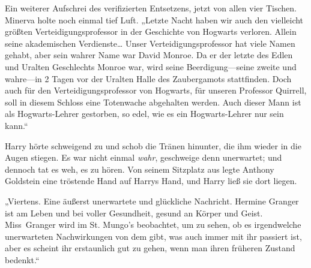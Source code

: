 Ein weiterer Aufschrei des verifizierten Entsetzens, jetzt von allen vier Tischen.
Minerva holte noch einmal tief Luft.
„Letzte Nacht haben wir auch den vielleicht größten Verteidigungsprofessor in der Geschichte von Hogwarts verloren. Allein seine akademischen Verdienste… Unser Verteidigungsprofessor hat viele Namen gehabt, aber sein wahrer Name war David Monroe. Da er der letzte des Edlen und Uralten Geschlechts Monroe war, wird seine Beerdigung—seine zweite und wahre—in 2 Tagen vor der Uralten Halle des Zaubergamots stattfinden. Doch auch für den Verteidigungsprofessor von Hogwarts, für unseren Professor Quirrell, soll in diesem Schloss eine Totenwache abgehalten werden. Auch dieser Mann ist als Hogwarts-Lehrer gestorben, so edel, wie es ein Hogwarts-Lehrer nur sein kann.“

Harry hörte schweigend zu und schob die Tränen hinunter, die ihm wieder in die Augen stiegen. Es war nicht einmal \emph{wahr}, geschweige denn unerwartet; und dennoch tat es weh, es zu hören.
Von seinem Sitzplatz aus legte Anthony Goldstein eine tröstende Hand auf Harrys Hand, und Harry ließ sie dort liegen.

„Viertens. Eine äußerst unerwartete und glückliche Nachricht. Hermine Granger ist am Leben und bei voller Gesundheit, gesund an Körper und Geist. Miss~Granger wird im St. Mungo’s beobachtet, um zu sehen, ob es irgendwelche unerwarteten Nachwirkungen von dem gibt, was auch immer mit ihr passiert ist, aber es scheint ihr erstaunlich gut zu gehen, wenn man ihren früheren Zustand bedenkt.“

